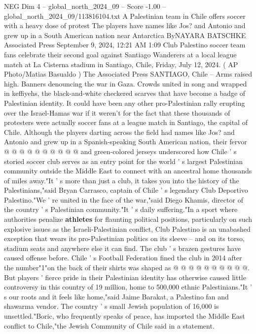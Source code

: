 \begin{textsample}{NEG Dim 4 – global\_north\_2024\_09 – Score -1.00 – global\_north\_2024\_09/113816104.txt}  \label{ex:f4_neg_131}
A Palestinian team in Chile offers soccer with a heavy dose of protest The players have names like Jos? and Antonio and grew up in a South American nation near Antarctica ByNAYARA BATSCHKE Associated Press September 9, 2024, 12:21 AM 1:09 Club Palestino soccer team fans celebrate their second goal against Santiago Wanderers at a local league match at La Cisterna stadium in Santiago, Chile, Friday, July 12, 2024. ( AP Photo/Matias Basualdo ) The Associated Press SANTIAGO, Chile -- Arms raised high.
Banners denouncing the war in Gaza.
Crowds united in song and wrapped in keffiyehs, the black-and-white checkered scarves that have become a badge of Palestinian identity.
It could have been any other pro-Palestinian rally erupting over the Israel-Hamas war if it weren't for the fact that these thousands of protesters were actually soccer fans at a league match in Santiago, the capital of Chile.
Although the players darting across the field had names like Jos? and Antonio and grew up in a Spanish-speaking South American nation, their fervor @ @ @ @ @ @ @ @ @ @ and green-colored jerseys underscored how Chile ' s storied soccer club serves as an entry point for the world ' s largest Palestinian community outside the Middle East to connect with an ancestral home thousands of miles away."It ' s more than just a club, it takes you into the history of the Palestinians,"said Bryan Carrasco, captain of Chile ' s legendary Club Deportivo Palestino."We ' re united in the face of the war,"said Diego Khamis, director of the country ' s Palestinian community."It ' s daily suffering."In a sport where authorities penalize \textbf{athletes} for flaunting political positions, particularly on such explosive issues as the Israeli-Palestinian conflict, Club Palestino is an unabashed exception that wears its pro-Palestinian politics on its sleeve -- and on its torso, stadium seats and anywhere else it can find.
The club ' s brazen gestures have caused offense before.
Chile ' s Football Federation fined the club in 2014 after the number"1"on the back of their shirts was shaped as @ @ @ @ @ @ @ @ @ @.
But players ' fierce pride in their Palestinian identity has otherwise caused little controversy in this country of 19 million, home to 500,000 ethnic Palestinians."It ' s our roots and it feels like home,"said Jaime Barakat, a Palestino fan and shawarma vendor.
The country ' s small Jewish population of 16,000 is unsettled."Boric, who frequently speaks of peace, has imported the Middle East conflict to Chile,"the Jewish Community of Chile said in a statement.

\end{textsample}
